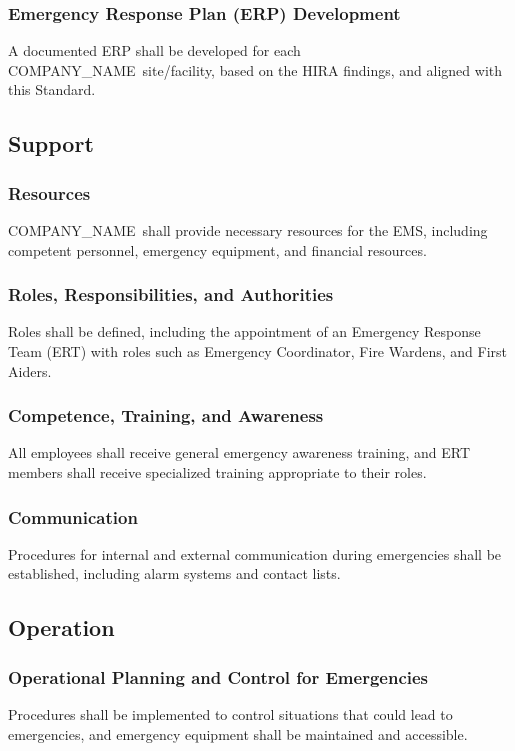 \documentclass[11pt]{article}
\newcommand{\clientName}{{{COMPANY_NAME}}}
\begin{document}
\subsubsection{Emergency Response Plan (ERP) Development}
A documented ERP shall be developed for each \clientName\ site/facility, based on the HIRA findings, and aligned with this Standard.

\subsection{Support}

\subsubsection{Resources}
\clientName\ shall provide necessary resources for the EMS, including competent personnel, emergency equipment, and financial resources.

\subsubsection{Roles, Responsibilities, and Authorities}
Roles shall be defined, including the appointment of an Emergency Response Team (ERT) with roles such as Emergency Coordinator, Fire Wardens, and First Aiders.

\subsubsection{Competence, Training, and Awareness}
All employees shall receive general emergency awareness training, and ERT members shall receive specialized training appropriate to their roles.

\subsubsection{Communication}
Procedures for internal and external communication during emergencies shall be established, including alarm systems and contact lists.

\subsection{Operation}

\subsubsection{Operational Planning and Control for Emergencies}
Procedures shall be implemented to control situations that could lead to emergencies, and emergency equipment shall be maintained and accessible.
\end{document}
